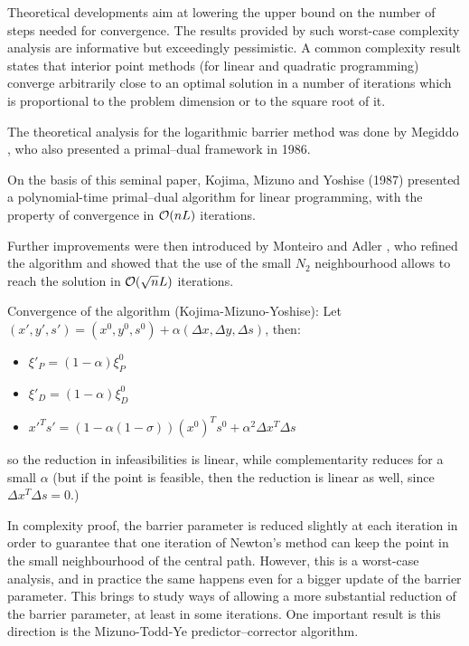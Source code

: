 Theoretical developments aim at lowering the upper bound on the number 
of steps needed for convergence. The results provided by such worst-case 
complexity analysis
are informative but exceedingly pessimistic. A common complexity result 
states that interior point methods (for linear and quadratic programming) 
converge arbitrarily close to an optimal solution in a number of iterations 
which is proportional to the problem dimension or to the square root of it.


The theoretical analysis for the logarithmic barrier method was
done by Megiddo \cite{Megiddo}, who also presented a primal--dual
framework in 1986. 

On the basis of this seminal paper, Kojima, Mizuno and Yoshise (1987) 
presented a polynomial-time primal--dual algorithm for linear programming, 
with the property of convergence in $\mathcal{O}(nL)$ iterations.

Further improvements were then introduced by Monteiro and Adler 
\cite{MonteiroAdler89a}, who refined the algorithm and showed that 
the use of the small $N_2$ neighbourhood allows to reach the solution 
in $\mathcal{O}(\sqrt{n}L)$ iterations.


Convergence of the algorithm (Kojima-Mizuno-Yoshise): 
Let $(x', y', s') = (x^0, y^0, s^0) + \alpha(\Delta x, \Delta y, \Delta s)$, 
then:
\begin{itemize}
\item $\xi'_P = (1-\alpha) \xi^0_P$
\item $\xi'_D = (1-\alpha) \xi^0_D$
\item $x'^Ts' = (1-\alpha (1 -\sigma))(x^0)^Ts^0 +\alpha^2 \Delta x^T \Delta s$
\end{itemize}
so the reduction in infeasibilities is linear, while complementarity reduces
for a small $\alpha$ (but if the point is feasible, then the reduction is
linear as well, since $\Delta x^T \Delta s = 0$.)

In complexity proof, the barrier parameter is reduced slightly at
each iteration in order to guarantee that one iteration of Newton's
method can keep the point in the small neighbourhood of the central path.
However, this is a worst-case analysis, and in practice the same happens
even for a bigger update of the barrier parameter. This brings to
study ways of allowing a more substantial reduction of the barrier
parameter, at least in some iterations. One important result is this
direction is the Mizuno-Todd-Ye predictor--corrector algorithm.

